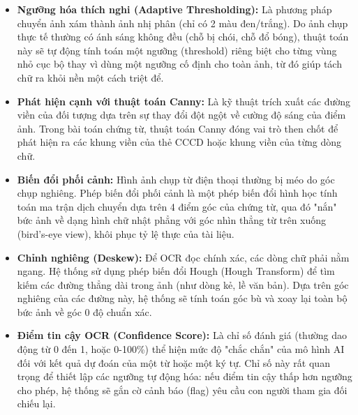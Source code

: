 \begin{itemize}
    \item \textbf{Ngưỡng hóa thích nghi (Adaptive Thresholding):}
    Là phương pháp chuyển ảnh xám thành ảnh nhị phân (chỉ có 2 màu đen/trắng). Do ảnh chụp thực tế thường có ánh sáng không đều (chỗ bị chói, chỗ đổ bóng), thuật toán này sẽ tự động tính toán một ngưỡng (threshold) riêng biệt cho từng vùng nhỏ cục bộ thay vì dùng một ngưỡng cố định cho toàn ảnh, từ đó giúp tách chữ ra khỏi nền một cách triệt để.

    \item \textbf{Phát hiện cạnh với thuật toán Canny:}
    Là kỹ thuật trích xuất các đường viền của đối tượng dựa trên sự thay đổi đột ngột về cường độ sáng của điểm ảnh. Trong bài toán chứng từ, thuật toán Canny đóng vai trò then chốt để phát hiện ra các khung viền của thẻ CCCD hoặc khung viền của từng dòng chữ.

    \item \textbf{Biến đổi phối cảnh:}
    Hình ảnh chụp từ điện thoại thường bị méo do góc chụp nghiêng. Phép biến đổi phối cảnh là một phép biến đổi hình học tính toán ma trận dịch chuyển dựa trên 4 điểm góc của chứng từ, qua đó "nắn" bức ảnh về dạng hình chữ nhật phẳng với góc nhìn thẳng từ trên xuống (bird's-eye view), khôi phục tỷ lệ thực của tài liệu.

    \item \textbf{Chỉnh nghiêng (Deskew):}
    Để OCR đọc chính xác, các dòng chữ phải nằm ngang. Hệ thống sử dụng phép biến đổi Hough (Hough Transform) để tìm kiếm các đường thẳng dài trong ảnh (như dòng kẻ, lề văn bản). Dựa trên góc nghiêng của các đường này, hệ thống sẽ tính toán góc bù và xoay lại toàn bộ bức ảnh về góc 0 độ chuẩn xác.

    \item \textbf{Điểm tin cậy OCR (Confidence Score):}
    Là chỉ số đánh giá (thường dao động từ 0 đến 1, hoặc 0-100\%) thể hiện mức độ "chắc chắn" của mô hình AI đối với kết quả dự đoán của một từ hoặc một ký tự. Chỉ số này rất quan trọng để thiết lập các ngưỡng tự động hóa: nếu điểm tin cậy thấp hơn ngưỡng cho phép, hệ thống sẽ gắn cờ cảnh báo (flag) yêu cầu con người tham gia đối chiếu lại.
\end{itemize}